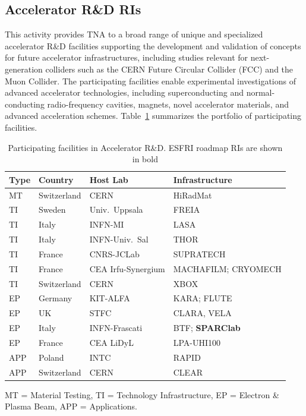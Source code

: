 \begin{itemize}
\subsection{Accelerator R\&D RIs}

This activity provides TNA  to a broad range of unique and specialized accelerator R\&D facilities supporting the development and validation of concepts for future accelerator infrastructures, including studies relevant for next-generation colliders such as the CERN Future Circular Collider (FCC) and the Muon Collider. The participating facilities enable experimental investigations of advanced accelerator technologies, including superconducting and normal-conducting radio-frequency cavities, magnets, novel accelerator materials, and advanced acceleration schemes. Table~\ref{tabl:wp3-ris} summarizes the portfolio of participating facilities.
\begin{table}[htb]
\centering
\caption{Participating facilities in Accelerator R\&D. ESFRI roadmap RIs are shown in bold}
\small
\begin{tabular}{
p{}
p{}
p{}
p{}
}
\toprule
\textbf{Type} & \textbf{Country} & \textbf{Host Lab} & \textbf{Infrastructure} \\
\midrule
MT & Switzerland & CERN & HiRadMat \\
TI & Sweden & Univ.\ Uppsala & FREIA \\
TI & Italy & INFN-MI & LASA \\
TI & Italy & INFN-Univ.\ Sal & THOR \\
TI & France & CNRS-JCLab & SUPRATECH \\
TI & France & CEA Irfu-Syn\-ergium & MACHAFILM; CRYOMECH \\
TI & Switzerland & CERN & XBOX \\
EP & Germany & KIT-ALFA & KARA; FLUTE \\
EP & UK & STFC & CLARA, VELA \\
EP & Italy & INFN-Frascati & BTF; \textbf{SPARClab} \\
EP & France & CEA LiDyL & LPA-UHI100 \\
APP & Poland & INTC & RAPID \\
APP & Switzerland & CERN & CLEAR \\
\bottomrule
\end{tabular}

\vspace{1mm}
\raggedright
\footnotesize
MT = Material Testing,
TI = Technology Infrastructure,
EP = Electron \& Plasma Beam,
APP = Applications.
\label{tabl:wp3-ris}
\end{table}


\end{itemize}

